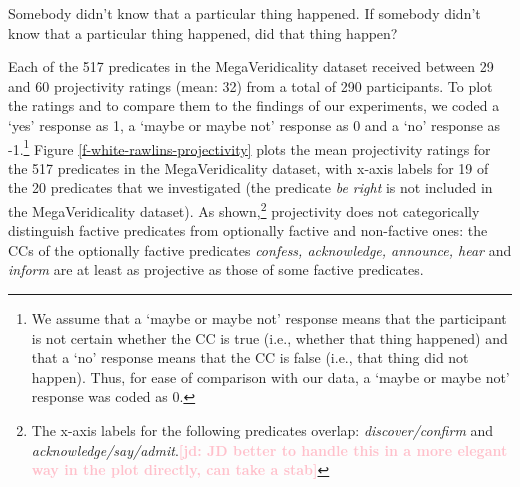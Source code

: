 \documentclass[11pt,fleqn]{article}
\newcommand{\jd}[1]{\textbf{\textcolor{Pink}{[jd: #1]}}}
\newcommand{\6}{\mbox{$[\hspace*{-.6mm}[$}}
\newcommand{\9}{\mbox{$]\hspace*{-.6mm}]$}}
\begin{document}
\begin{exe}
\ex\label{wr-stim-proj}
\begin{xlist}
\ex Somebody didn't know that a particular thing happened.
\ex If somebody didn't know that a particular thing happened, did that thing happen?
\end{xlist}
\end{exe}

Each of the 517 predicates in the MegaVeridicality dataset received between 29 and 60 projectivity ratings (mean: 32) from a total of 290 participants. To plot the ratings and to compare them to the findings of our experiments, we coded a `yes' response as 1,  a `maybe or maybe not' response as 0 and a `no' response as -1.\footnote{We assume that a `maybe or maybe not' response means that the participant is not certain whether the CC is true (i.e., whether that thing happened) and that a `no' response means that the CC is false (i.e., that thing did not happen). Thus, for ease of comparison with our data, a `maybe or maybe not' response was coded as 0.} Figure \ref{f-white-rawlins-projectivity} plots the mean projectivity ratings for the 517 predicates in the MegaVeridicality dataset, with x-axis labels for 19 of the 20 predicates that we investigated (the predicate {\em be right} is not included in the MegaVeridicality dataset). As shown,\footnote{The x-axis labels for the following predicates overlap: {\em discover/confirm} and {\em acknowledge/say/admit}.\jd{JD better to handle this in a more elegant way in the plot directly, can take a stab}} projectivity does not categorically distinguish factive predicates from optionally factive and non-factive ones: the CCs of the optionally factive predicates {\em confess, acknowledge, announce, hear} and {\em inform} are at least as projective as those of some factive predicates. 
\end{document}
